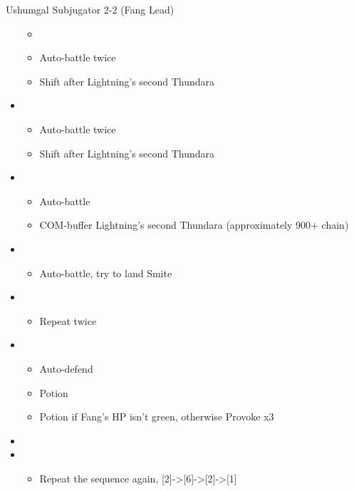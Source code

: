 \begin{paracol}{2}
\begin{battle}{Ushumgal Subjugator 2-2 (Fang Lead)}
\begin{itemize}
\begin{itemize}
				      \item \stagger
				      \item Auto-battle twice
				      \item Shift after Lightning's second Thundara
			      \end{itemize}
			\item \sixth
			      \begin{itemize}
				      \item Auto-battle twice
				      \item Shift after Lightning's second Thundara
			      \end{itemize}
			\item \second
			      \begin{itemize}
				      \item Auto-battle
				      \item COM-buffer Lightning's second Thundara (approximately 900+ chain)
			      \end{itemize}
			\item \first
			      \begin{itemize}
				      \item Auto-battle, try to land Smite
			      \end{itemize}
			\item \third
			      \begin{itemize}
				      \item Repeat twice
			      \end{itemize}
			\item \fourth
			      \begin{itemize}
				      \item Auto-defend
				      \item Potion
				      \item Potion if Fang's HP isn't green, otherwise Provoke x3
			      \end{itemize}
			\item \stagger
			\item \second
			      \begin{itemize}
				      \item Repeat the sequence again, [2]->[6]->[2]->[1]
			      \end{itemize}
		\end{itemize}
	\end{battle}




\end{paracol}
